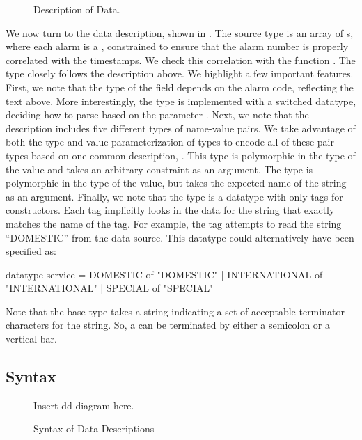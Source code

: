 \documentclass{entcs}
\begin{document}
\begin{figure}
  \centering
  \small
  
  \caption{Description of \darkstar{} Data.}
  \label{fig:darkstar-ml}
\end{figure}
We now turn to the data description, shown in .
The source type is an array of s, where each alarm is a
, constrained to ensure that the alarm number is
properly correlated with the timestamps.  We check this correlation
with the function .  The type  closely
follows the description above. We highlight a few important features.
First, we note that the type of the field  depends on the
alarm code, reflecting the text above. More interestingly, the type
 is implemented with a switched datatype, deciding how to
parse based on the parameter .  Next, we note that the
description includes five different types of name-value pairs. We take
advantage of both the type and value parameterization of types to
encode all of these pair types based on one common description,
. This type is polymorphic in the type of the value and takes
an arbitrary constraint  as an argument. The type  is
polymorphic in the type of the value, but takes the expected name of
the string as an argument. Finally, we note that the type 
is a datatype with only tags for constructors.  Each tag implicitly
looks in the data for the string that exactly matches the name of the
tag. For example, the tag  attempts to read the string
``DOMESTIC'' from the data source. This datatype could alternatively
have been specified as:
\begin{code}
datatype service =
    DOMESTIC      of "DOMESTIC"
  | INTERNATIONAL of "INTERNATIONAL"
  | SPECIAL       of "SPECIAL"
\end{code}

Note that the base type  takes a string indicating a set
of acceptable terminator characters for the string. So, a
 can be terminated by either a semicolon or a
vertical bar.

\subsection{Syntax}

\begin{figure}
  \centering
Insert dd diagram here.
  \caption{Syntax of Data Descriptions}
  \label{fig:syntax-dd}
\end{figure}
\end{document}
